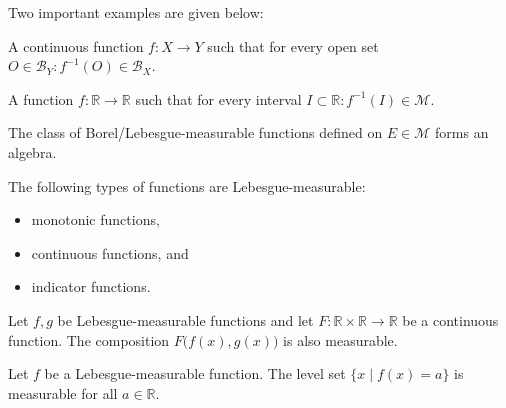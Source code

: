     Two important examples are given below:
    \begin{example}\label{measure:borel_measurable_function}
        A continuous function $f:X\rightarrow Y$ such that for every open set $O\in\mathcal{B}_Y:f^{-1}(O)\in\mathcal{B}_X$.
    \end{example}
    \begin{example}\label{measure:measurable_function}
        A function $f:\mathbb{R}\rightarrow\mathbb{R}$ such that for every interval $I\subset\mathbb{R}:f^{-1}(I)\in\mathcal{M}$.
    \end{example}

    \begin{property}
        The class of Borel/Lebesgue-measurable functions defined on $E\in\mathcal{M}$ forms an algebra.
    \end{property}

    \begin{example}
        The following types of functions are Lebesgue-measurable:
        \begin{itemize}
            \item monotonic functions,
            \item continuous functions, and
            \item indicator functions.
        \end{itemize}
    \end{example}
    \begin{result}
        Let $f,g$ be Lebesgue-measurable functions and let $F:\mathbb{R}\times\mathbb{R}\rightarrow\mathbb{R}$ be a continuous function. The composition $F\bigl(f(x),g(x)\bigr)$ is also measurable.
    \end{result}

    \begin{property}
        Let $f$ be a Lebesgue-measurable function. The level set $\{x\mid f(x)=a\}$ is measurable for all $a\in\mathbb{R}$.
    \end{property}

